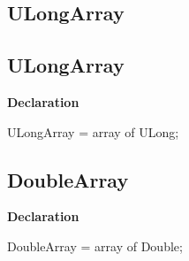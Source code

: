 \documentclass{report}
\newif\ifpdf
\begin{document}
\subsection*{\large{\textbf{ULongArray}}\normalsize\hspace{1ex}\hrulefill}
\else
\subsection*{ULongArray}
\fi
\label{NewPascal.Base-ULongArray}
\begin{list}{}{
\setlength{\itemindent}{0cm}
\setlength{\listparindent}{0cm}
\setlength{\leftmargin}{\evensidemargin}
\addtolength{\leftmargin}{\tmplength}
\settowidth{\labelsep}{X}
\addtolength{\leftmargin}{\labelsep}
\setlength{\labelwidth}{\tmplength}
}
\item[\textbf{Declaration}\hfill]
\ifpdf
\begin{flushleft}
\fi
\begin{ttfamily}
ULongArray = array of ULong;\end{ttfamily}

\ifpdf
\end{flushleft}
\fi

\end{list}
\ifpdf
\subsection*{\large{\textbf{DoubleArray}}\normalsize\hspace{1ex}\hrulefill}
\else
\subsection*{DoubleArray}
\fi
\label{NewPascal.Base-DoubleArray}
\begin{list}{}{
\setlength{\itemindent}{0cm}
\setlength{\listparindent}{0cm}
\setlength{\leftmargin}{\evensidemargin}
\addtolength{\leftmargin}{\tmplength}
\settowidth{\labelsep}{X}
\addtolength{\leftmargin}{\labelsep}
\setlength{\labelwidth}{\tmplength}
}
\item[\textbf{Declaration}\hfill]
\ifpdf
\begin{flushleft}
\fi
\begin{ttfamily}
DoubleArray = array of Double;\end{ttfamily}

\ifpdf
\end{flushleft}
\fi

\end{list}
\ifpdf
\end{document}
